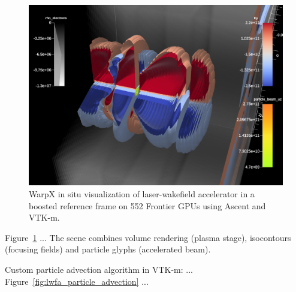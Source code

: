 \begin{figure}[htb]
  \includegraphics[width=\linewidth]{figures/warpx_stages_lwfa.png}
  \caption{WarpX in situ visualization of laser-wakefield accelerator in a boosted reference frame on 552 Frontier GPUs using Ascent and VTK-m.}
  \label{fig:warpx_lwfa}
\end{figure}

Figure~\ref{fig:warpx_lwfa} ...
The scene combines volume rendering (plasma stage), isocontours (focusing fields) and particle glyphs (accelerated beam).

Custom particle advection algorithm in VTK-m: ...
Figure~\ref{fig:lwfa_particle_advection} ...

